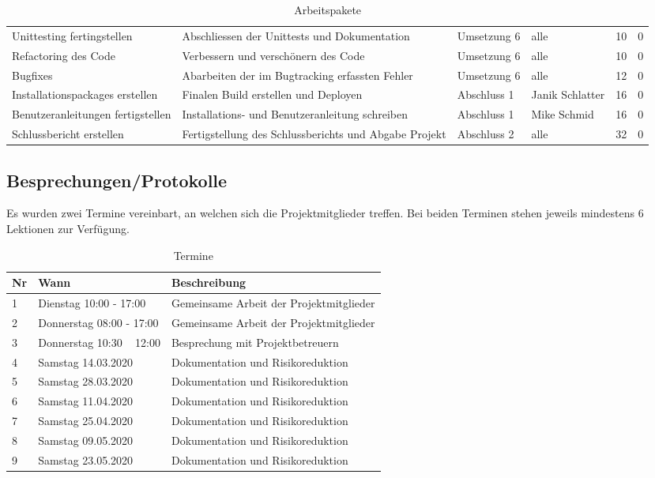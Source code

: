 \documentclass[
	ngerman,
	toc=listof, %
	toc=bibliography, %
	footnotes=multiple, %
	parskip=half, %
	numbers=noendperiod %
]{scrartcl}
\begin{document}
\begin{landscape}
\begin{table}[!h]
\begin{tabularx}{\linewidth}{lXllll}
					Unittesting fertingstellen & Abschliessen der Unittests und Dokumentation & Umsetzung 6 & alle & 10 & 0 \\
					Refactoring des Code & Verbessern und verschönern des Code & Umsetzung 6 & alle & 10 & 0 \\
					Bugfixes & Abarbeiten der im Bugtracking erfassten Fehler & Umsetzung 6 & alle & 12 & 0 \\
					\midrule
					Installationspackages erstellen & Finalen Build erstellen und Deployen & Abschluss 1 & Janik Schlatter & 16 & 0 \\
					Benutzeranleitungen fertigstellen & Installations- und Benutzeranleitung schreiben & Abschluss 1 & Mike Schmid & 16 & 0 \\
					Schlussbericht erstellen & Fertigstellung des Schlussberichts und Abgabe Projekt & Abschluss 2 & alle & 32 & 0 \\
					\bottomrule
				\end{tabularx}
			\caption{Arbeitspakete}	
			\end{table}
		\end{landscape}

	\subsection{Besprechungen/Protokolle}
	\label{sec:dates}
		Es wurden zwei Termine vereinbart, an welchen sich die Projektmitglieder treffen. 
		Bei beiden Terminen stehen jeweils mindestens 6 Lektionen zur Verfügung.

		\begin{table}[!h]
			\begin{tabularx}{0.9 \linewidth}{llX}
				\toprule
				Nr & Wann & Beschreibung \\
				\midrule
				1 & Dienstag 10:00 - 17:00 & Gemeinsame Arbeit der Projektmitglieder \\
				2 & Donnerstag 08:00 - 17:00 & Gemeinsame Arbeit der Projektmitglieder \\
				3 & Donnerstag 10:30 ~ 12:00 & Besprechung mit Projektbetreuern \\
				4 & Samstag 14.03.2020 & Dokumentation und Risikoreduktion\\
				5 & Samstag 28.03.2020 & Dokumentation und Risikoreduktion\\
				6 & Samstag 11.04.2020 & Dokumentation und Risikoreduktion\\
				7 & Samstag 25.04.2020 & Dokumentation und Risikoreduktion\\
				8 & Samstag 09.05.2020 & Dokumentation und Risikoreduktion\\
				9 & Samstag 23.05.2020 & Dokumentation und Risikoreduktion\\

				\bottomrule
			\end{tabularx}
			\caption{Termine}
		\end{table}
			
\end{document}
